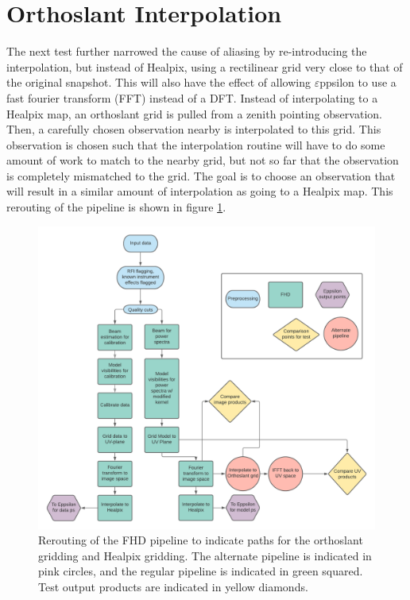 \documentclass[linenumbers]{aastex631}
\newcommand\eppsilon{$\varepsilon$ppsilon\xspace}
\begin{document}
\section{Orthoslant Interpolation}
The next test further narrowed the cause of aliasing by re-introducing the interpolation, but instead of Healpix, using a rectilinear grid very close to that of the original snapshot. This will also have the effect of allowing \eppsilon{} to use a fast fourier transform (FFT) instead of a DFT. Instead of interpolating to a Healpix map, an orthoslant grid is pulled from a zenith pointing observation. Then, a carefully chosen observation nearby is interpolated to this grid. This observation is chosen such that the interpolation routine will have to do some amount of work to match to the nearby grid, but not so far that the observation is completely mismatched to the grid. The goal is to choose an observation that will result in a similar amount of interpolation as going to a Healpix map. This rerouting of the pipeline is shown in figure \ref{fig:orthoslantflow}. 
\\
\begin{figure}[!h]
    \centering
    \includegraphics[scale=.2]{FHD pipeline diagram.png}
    \caption{Rerouting of the FHD pipeline to indicate paths for the orthoslant gridding and  Healpix gridding. The alternate pipeline is indicated in pink circles, and the regular pipeline is indicated in green squared. Test output products are indicated in yellow diamonds.}
    \label{fig:orthoslantflow}
\end{figure}
\end{document}
